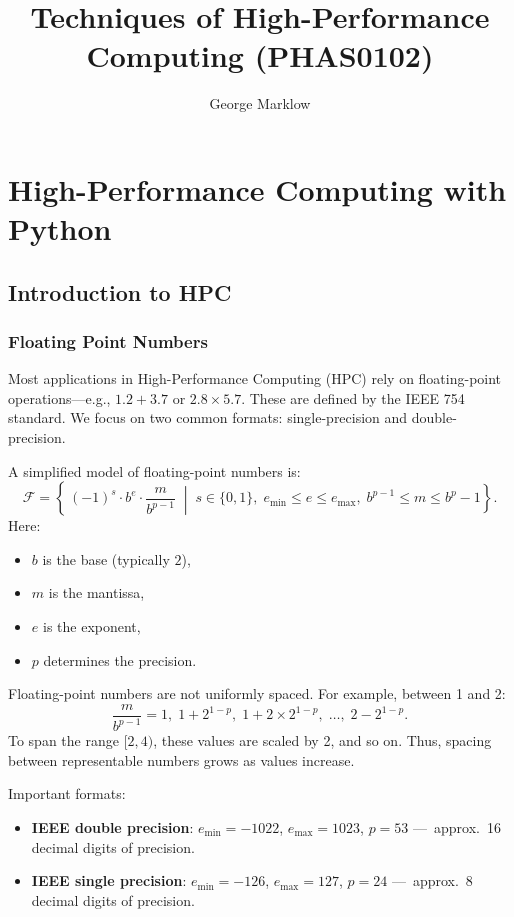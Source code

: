 \documentclass[11pt,a4paper]{book}
\begin{document}
\author{George Marklow}
\title{Techniques of High-Performance Computing (PHAS0102)}
\maketitle

\frontmatter

\pagebreak

\tableofcontents

\mainmatter

\pagebreak

\part{High-Performance Computing with Python}

\chapter{Introduction to HPC}

\section{Floating Point Numbers}
Most applications in High-Performance Computing (HPC) rely on floating-point operations—e.g., \(1.2 + 3.7\) or \(2.8 \times 5.7\). These are defined by the IEEE 754 standard. We focus on two common formats: single-precision and double-precision.

A simplified model of floating-point numbers is:
\[
\mathcal{F} = \left\{\,(-1)^s \cdot b^e \cdot \frac{m}{b^{p-1}} \;\middle|\; s\in\{0,1\},\; e_{\min}\le e\le e_{\max},\; b^{p-1}\le m\le b^p-1\right\}.
\]
Here:
\begin{itemize}
  \item \(b\) is the base (typically \(2\)),
  \item \(m\) is the mantissa,
  \item \(e\) is the exponent,
  \item \(p\) determines the precision.
\end{itemize}

Floating-point numbers are not uniformly spaced. For example, between 1 and 2:
\[
\frac{m}{b^{p-1}} = 1,\; 1 + 2^{1-p},\; 1 + 2\times 2^{1-p},\;\dots,\; 2 - 2^{1-p}.
\]
To span the range \([2,4)\), these values are scaled by 2, and so on. Thus, spacing between representable numbers grows as values increase.

Important formats:
\begin{itemize}
  \item \textbf{IEEE double precision}: \(e_{\min} = -1022\), \(e_{\max} = 1023\), \(p = 53\) —~approx.~16 decimal digits of precision.
  \item \textbf{IEEE single precision}: \(e_{\min} = -126\), \(e_{\max} = 127\), \(p = 24\) —~approx.~8 decimal digits of precision.
\end{itemize}
\end{document}
